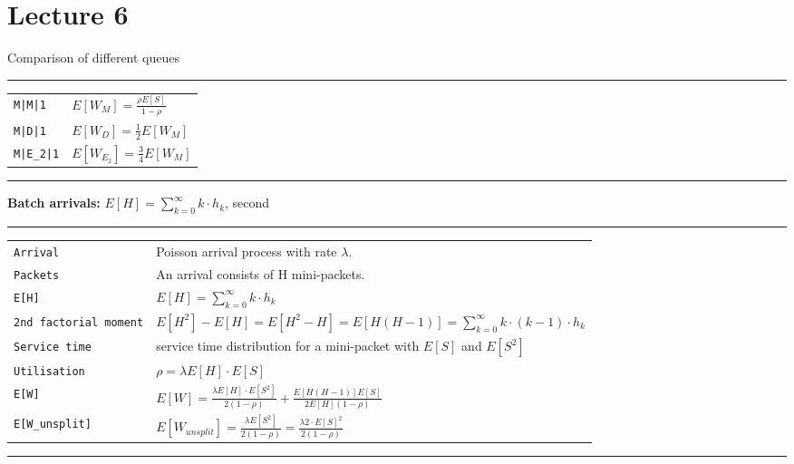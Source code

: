 
\section{Lecture 6}
Comparison of different queues
\hrule
\newlength{\MyLen}
\begin{tabular}{@{}p{\the\MyLen}@{}p{\linewidth-\the\MyLen}@{}}
\verb!M|M|1!	&  $E[W_M] = \frac{\rho E[S]}{1-\rho}$\\
\verb!M|D|1!	&  $E[W_D] = \frac{1}{2}E[W_M] $\\
\verb!M|E_2|1!	&  $E[W_{E_2}] = \frac{3}{4} E[W_M] $\\
\end{tabular}
\hrule

\textbf{Batch arrivals:} $E[H] = \sum_{k=0}^{\infty} k \cdot h_{k}$, second

\hrule
{}
\begin{tabular}{@{}p{\the\MyLen}@{}p{\linewidth-\the\MyLen}@{}}
\verb!Arrival!	&  Poisson arrival process with rate $\lambda$.\\
\verb!Packets!	&  An arrival consists of H mini-packets.\\
\verb!E[H]!	&  $E[H] = \sum_{k=0}^{\infty} k \cdot h_{k}$\\
\verb!2nd factorial moment!	&  $E[H^{2}] - E[H] = E[H^{2} - H] = E[H(H-1)]= \sum_{k=0}^{\infty} k \cdot (k-1) \cdot h_{k}$\\
\verb!Service time!	&  service time distribution for a mini-packet with $E[S]$ and $E[S^{2}]$\\
\verb!Utilisation!	&  $\rho = \lambda E[H] \cdot E[S]$\\
\verb!E[W]!	&  $E[W] = \frac{\lambda E[H] \cdot E[S^2]}{2(1-\rho)} + \frac{E[H(H-1)]E[S]}{2E[H](1-\rho)}$\\
\verb!E[W_unsplit]!	&  $E[W_{unsplit}] = \frac{\lambda E[S^{2}]}{2(1-\rho)} = \frac{\lambda 2 \cdot E[S]^{2}}{2(1-\rho)}$\\
\end{tabular}
\hrule

